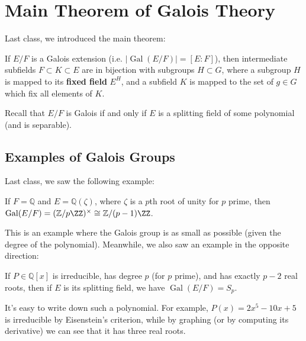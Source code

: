 

\section{Main Theorem of Galois Theory}

Last class, we introduced the main theorem: 

\begin{theorem}
    If $E/F$ is a Galois extension (i.e. $\lvert\operatorname{Gal}(E/F)\rvert = [E : F]$), then intermediate subfields $F \subset K \subset E$ are in bijection with subgroups $H \subset G$, where a subgroup $H$ is mapped to its \textbf{fixed field} $E^H$, and a subfield $K$ is mapped to the set of $g \in G$ which fix all elements of $K$. 
\end{theorem}

Recall that $E/F$ is Galois if and only if $E$ is a splitting field of some polynomial (and is separable). 

\subsection{Examples of Galois Groups}

Last class, we saw the following example: 

\begin{example}
    If $F = \mathbb{Q}$ and $E = \mathbb{Q}(\zeta)$, where $\zeta$ is a $p$th root of unity for $p$ prime, then $\operatorname{Gal}(E/F) = (\mathbb{Z}/p\ZZ)^\times \cong \mathbb{Z}/(p - 1)\ZZ$. 
\end{example}

This is an example where the Galois group is as small as possible (given the degree of the polynomial). Meanwhile, we also saw an example in the opposite direction:

\begin{example}
    If $P \in \mathbb{Q}[x]$ is irreducible, has degree $p$ (for $p$ prime), and has exactly $p - 2$ real roots, then if $E$ is its splitting field, we have $\operatorname{Gal}(E/F) = S_p$. 
\end{example}

It's easy to write down such a polynomial. For example, $P(x) = 2x^5 - 10x + 5$ is irreducible by Eisenstein's criterion, while by graphing (or by computing its derivative) we can see that it has three real roots. 


